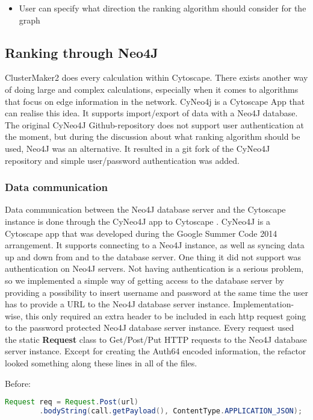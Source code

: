 \begin{itemize}
    \item User can specify what direction the ranking algorithm should consider
        for the graph
\end{itemize}

\subsection{Ranking through Neo4J}
ClusterMaker2 does every calculation within Cytoscape. There exists another way
of doing large and complex calculations, especially when it comes to algorithms
that focus on edge information in the network. CyNeo4j\cite{cyneo4j} is
a Cytoscape App that can realise this idea. It supports import/export of data
with a Neo4J\cite{neo4j} database. The original CyNeo4J Github-repository does
not support user authentication at the moment, but during the discussion about
what ranking algorithm should be used, Neo4J was an alternative. It resulted in
a git fork\cite{git-fork} of the CyNeo4J repository and simple user/password
authentication was added.

\subsubsection{Data communication}
Data communication between the Neo4J database server and the Cytoscape instance
is done through the CyNeo4J app to Cytoscape \cite{cyneo4j}. CyNeo4J is a
Cytoscape app that was developed during the Google Summer Code 2014 arrangement.
It supports connecting to a Neo4J instance, as well as syncing data up and down
from and to the database server. One thing it did not support was authentication
on Neo4J servers. Not having authentication is a serious problem, so we
implemented a simple way of getting access to the database server by providing a
possibility to insert username and password at the same time the user has to
provide a URL to the Neo4J database server instance. Implementation-wise, this
only required an extra header to be included in each http request going to the
password protected Neo4J database server instance. Every request used the static
\textbf{Request} class to Get/Post/Put HTTP requests to the Neo4J database
server instance. Except for creating the Auth64 encoded information, the
refactor looked something along these lines in all of the files.

Before:
\begin{lstlisting}[frame=single,language=Java]
Request req = Request.Post(url)
        .bodyString(call.getPayload(), ContentType.APPLICATION_JSON);
\end{lstlisting}

